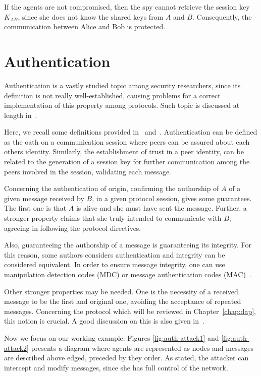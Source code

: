 If the agents are not compromised, then the spy cannot retrieve the session key \(K_{AB}\), since she does not know the shared keys from \(A\) and \(B\). Consequently, the communication between Alice and Bob is protected.





\section{Authentication}\label{sec:protocols:auth}
Authentication is a vastly studied topic among security researchers, since its definition is not really well-established, causing problems for a correct implementation of this property among protocols. Such topic is discussed at length in~\cite{Gollmann2000}.

Here, we recall some definitions provided in~\cite{Diffie92} and~\cite{RyanSchneider2010}. Authentication can be defined as the oath on a communication session where peers can be assured about each others identity. Similarly, the establishment of trust in a peer identity, can be related to the generation of a session key for further communication among the peers involved in the session, validating each message.

Concerning the authentication of origin, confirming the authorship of \(A\) of a given message received by \(B\), in a given protocol session, gives some guarantees. The first one is that \(A\) is alive and she must have sent the message. Further, a stronger property claims that she truly intended to communicate with \(B\), agreeing in following the protocol directives.

Also, guaranteeing the authorship of a message is guaranteeing its integrity. For this reason, some authors \cite{Bella2007} considers authentication and integrity can be considered equivalent. In order to ensure message integrity, one can use manipulation detection codes (MDC) or message authentication codes (MAC)~\cite{ross-security}.

Other stronger properties may be needed. One is the necessity of a received message to be the first and original one, avoiding the acceptance of repeated messages. Concerning the protocol which will be reviewed in Chapter~\ref{chap:dap}, this notion is crucial. A good discussion on this is also given in~\cite{Gollmann2000}.

Now we focus on our working example. Figures \ref{fig:auth-attack1} and \ref{fig:auth-attack2} presents a diagram where agents are represented as nodes and messages are described above edged, preceded by they order. As stated, the attacker can intercept and modify messages, since she has full control of the network.

